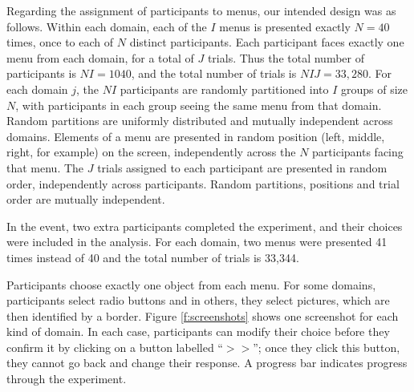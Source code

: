 \documentclass[11pt,letter]{article}
\newcommand{\menu}{menu}
\newcommand{\menus}{menus}
\begin{document}
Regarding the assignment of participants to \menus{}, our intended design was as follows.
Within each domain, each of the $I$ \menus{} is presented exactly $N=40$ times, once to each of $N$ distinct participants.
Each participant faces exactly one \menu{} from each domain, for a total of $J$ trials.
Thus the total number of participants is $NI=1040$, and the total number of trials is $NIJ=33,280$.
For each domain $j$, the $NI$ participants are randomly partitioned into $I$ groups of size $N$, with participants in each group seeing the same \menu{} from that domain.
Random partitions are uniformly distributed and mutually independent across domains.
Elements of a \menu{} are presented in random position (left, middle, right, for example) on the screen, independently across the $N$ participants facing that \menu{}.
The $J$ trials assigned to each participant are presented in random order, independently across participants.
Random partitions, positions and trial order are mutually independent.

In the event, two extra participants completed the experiment, and their choices were included in the analysis.
For each domain, two \menus{} were presented 41 times instead of 40 and the total number of trials is 33,344.

Participants choose exactly one object from each \menu{}.
For some domains, participants select radio buttons and in others, they select pictures, which are then identified by a border.
Figure \ref{f:screenshots} shows one screenshot for each kind of domain.
In each case, participants can modify their choice before they confirm it by clicking on a button labelled ``$>>$''; once they click this button, they cannot go back and change their response.
A progress bar indicates progress through the experiment.
\end{document}
